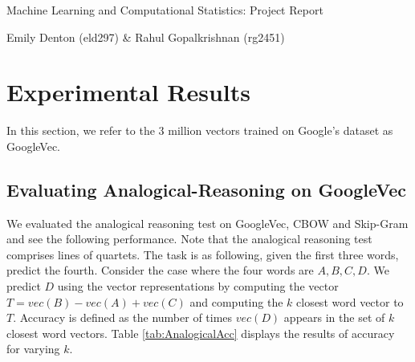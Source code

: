 \documentclass[11pt]{article}
\begin{document}
\vspace*{8cm}

\centerline{\sc \Large Machine Learning and Computational Statistics: Project Report}

\vspace{1cm}

\centerline{\sc \small Emily Denton (eld297)  \& Rahul Gopalkrishnan (rg2451)}
         
\clearpage 










\clearpage

\section{Experimental Results}
In this section, we refer to the 3 million vectors trained on Google's dataset as GoogleVec. 

\subsection{Evaluating Analogical-Reasoning on GoogleVec}
We evaluated the analogical reasoning test on GoogleVec, CBOW and Skip-Gram and see the following performance. Note that the analogical reasoning test comprises lines of quartets. The task is as following, given the first three words, predict the fourth. Consider the case where the four words are $A,B,C,D$. We predict $D$ using the vector representations by computing the vector $T=vec(B)-vec(A)+vec(C)$ and computing the $k$ closest word vector to $T$. Accuracy is defined as the number of times $vec(D)$ appears in the set of $k$ closest word vectors. Table \ref{tab:AnalogicalAcc} displays the results of accuracy for varying $k$.
\end{document}
